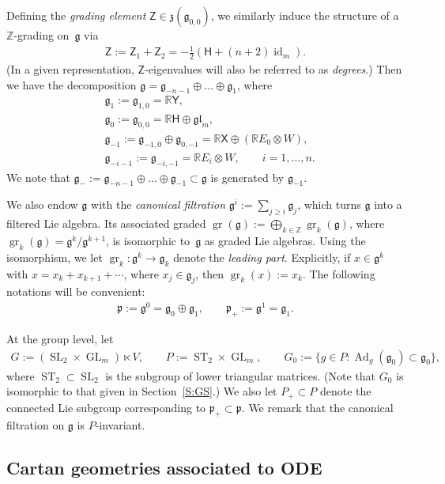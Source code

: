 \documentclass[pdftex]{sigma}%
\newcommand\tensor{\otimes}
\newcommand\ST{\operatorname{ST}}
\DeclareMathOperator{\gr}{gr}
\DeclareMathOperator{\id}{id}
\newcommand\GL{\operatorname{GL}}
\newcommand{\g}{\mathfrak{g}}
\newcommand{\gl}{\mathfrak{gl}}
\newcommand\Ad{\operatorname{Ad}}
\renewcommand\gr{\operatorname{gr}}
\newcommand\fg{\mathfrak{g}}
\newcommand\fp{\mathfrak{p}}
\newcommand\fz {\mathfrak{z}}
\newcommand{\R}{\mathbb{R}}
\newcommand{\Z}{\mathbb{Z}}
\newcommand\SL{\operatorname{SL}}
\newcommand\sfX{\mathsf{X}}
\newcommand\sfH{\mathsf{H}}
\newcommand\sfY{\mathsf{Y}}
\newcommand\sfZ{\mathsf{Z}}
\numberwithin{equation}{section}
\begin{document}
Defining the {\em grading element} $\sfZ \in \fz(\g_{0,0})$, we similarly induce the structure of a $\Z$-grading on~$\g$ via
\begin{align*}%
\sfZ := \sfZ_1 + \sfZ_2 = -\frac{1}{2} (\sfH + (n+2)\id_m ).
\end{align*}
(In a given representation, $\sfZ$-eigenvalues will also be referred to as {\em degrees}.) Then we have the decomposition
$\g = \g_{-n-1} \oplus \dots \oplus \g_1$, where
\begin{align*}
 &\g_1 := \g_{1,0} =\R \sfY, \\
 &\g_0 := \g_{0,0}=\R \sfH \oplus \gl_m,\\
 &\g_{-1} := \g_{-1,0} \oplus \g_{0,-1} = \R \sfX \oplus (\R E_0 \tensor W),\\
 &\g_{-i-1} := \g_{-i,-1} = \R E_i \tensor W, \qquad i = 1,\dots, n.
\end{align*}
We note that $\g_- := \g_{-n-1} \oplus \dots \oplus \g_{-1} \subset \g$ is generated by $\g_{-1}$.

We also endow $\g$ with the {\em canonical filtration} $\g^{i} := \sum_{j \ge i}\g_{j}$, which turns $\g$ into a filtered Lie algebra. Its associated graded $\gr(\g) := \bigoplus_{k \in \Z} \gr_k(\g)$, where $\gr_k(\g) = \g^k/\g^{k +1}$, is isomorphic to~$\g$ as graded Lie algebras. Using the isomorphism, we let $\gr_k\colon \g^k \to \g_k$ denote the {\em leading part}. Explicitly, if $x \in \g^k$ with $x=x_k + x_{k+1} + \cdots$, where $x_j \in \g_j$, then $\gr_k(x) := x_k$. The following notations will be convenient:
 \begin{align*}
 \fp:= \g^{0} = \fg_0 \oplus \fg_1, \qquad
 \fp_{+}:= \g^{1} = \fg_1.
 \end{align*}


At the group level, let
 \begin{align*}
 G := (\SL_2 \times \GL_m) \ltimes V, \qquad
 P := \ST_2 \times \GL_m, \qquad
 G_0 := \{ g \in P\colon \Ad_g (\g_0) \subset \g_0 \},
 \end{align*}
where $\ST_2 \subset \SL_2$ is the subgroup of lower triangular matrices. (Note that $G_0$ is isomorphic to that given in Section~\ref{S:GS}.) We also let $P_+ \subset P$ denote the connected Lie subgroup corresponding to $\fp_+ \subset \fp$. We remark that the canonical filtration on $\fg$ is $P$-invariant.

\subsection{Cartan geometries associated to ODE} \label{S:CG}
\end{document}
